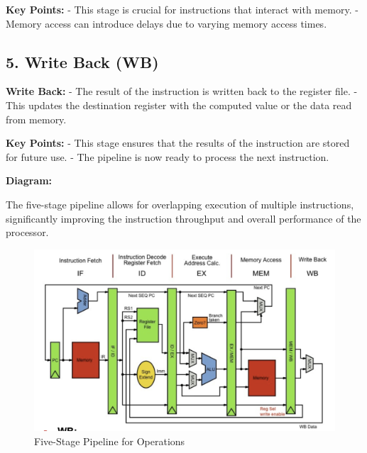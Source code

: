 \documentclass{report}
\begin{document}
\textbf{Key Points:}
- This stage is crucial for instructions that interact with memory.
- Memory access can introduce delays due to varying memory access times.

\subsection{5. Write Back (WB)}

\textbf{Write Back:}
- The result of the instruction is written back to the register file.
- This updates the destination register with the computed value or the data read from memory.

\textbf{Key Points:}
- This stage ensures that the results of the instruction are stored for future use.
- The pipeline is now ready to process the next instruction.

\textbf{Diagram:}

\begin{center}
\end{center}

The five-stage pipeline allows for overlapping execution of multiple instructions, significantly improving the instruction throughput and overall performance of the processor.

\begin{figure}[h]
	\centering
	\includegraphics[width=\textwidth]{5stage.png}
	\caption{Five-Stage Pipeline for Operations}
	\label{fig:5stage}
\end{figure}
\end{document}

